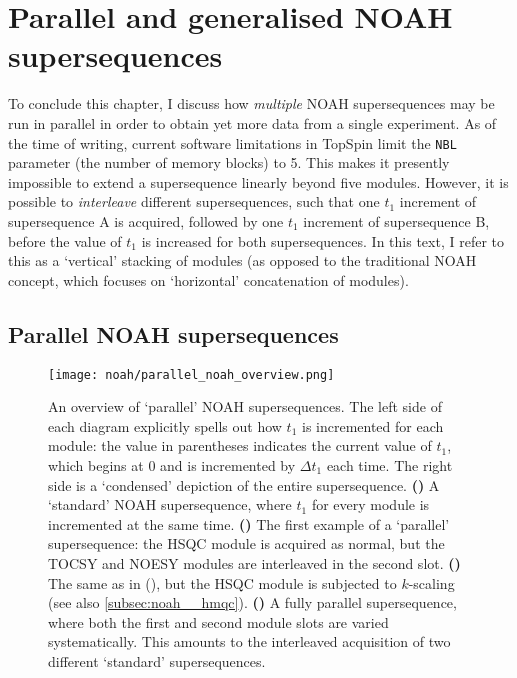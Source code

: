 \section{Parallel and generalised NOAH supersequences}
\label{sec:noah__parallel}

To conclude this chapter, I discuss how \textit{multiple} NOAH supersequences may be run in parallel in order to obtain yet more data from a single experiment.
As of the time of writing, current software limitations in TopSpin limit the \texttt{NBL} parameter (the number of memory blocks) to 5.
This makes it presently impossible to extend a supersequence linearly beyond five modules.
However, it is possible to \textit{interleave} different supersequences, such that one $t_1$ increment of supersequence A is acquired, followed by one $t_1$ increment of supersequence B, before the value of $t_1$ is increased for both supersequences.
In this text, I refer to this as a `vertical' stacking of modules (as opposed to the traditional NOAH concept, which focuses on `horizontal' concatenation of modules).

\subsection{Parallel NOAH supersequences}
\label{sec:noah__parallel_parallel}

\begin{figure}[!htbp]
    \centering
    \texttt{[image: noah/parallel\_noah\_overview.png]}%
    {\label{fig:parallel_noah_overview_conv}}%
    {\label{fig:parallel_noah_overview_interleaved}}%
    {\label{fig:parallel_noah_overview_kscaled}}%
    {\label{fig:parallel_noah_overview_parallel}}%
    \caption[Overview of parallel NOAH supersequences]{
        An overview of `parallel' NOAH supersequences.
        The left side of each diagram explicitly spells out how $t_1$ is incremented for each module: the value in parentheses indicates the current value of $t_1$, which begins at 0 and is incremented by $\Delta t_1$ each time.
        The right side is a `condensed' depiction of the entire supersequence.
        \textbf{()} A `standard' NOAH supersequence, where $t_1$ for every module is incremented at the same time.
        \textbf{()} The first example of a `parallel' supersequence: the HSQC module is acquired as normal, but the TOCSY and NOESY modules are interleaved in the second slot.
        \textbf{()} The same as in (), but the HSQC module is subjected to $k$-scaling (see also \cref{subsec:noah__hmqc}).
        \textbf{()} A fully parallel supersequence, where both the first and second module slots are varied systematically.
        This amounts to the interleaved acquisition of two different `standard' supersequences.
    }
    \label{fig:parallel_noah_overview}
\end{figure}

